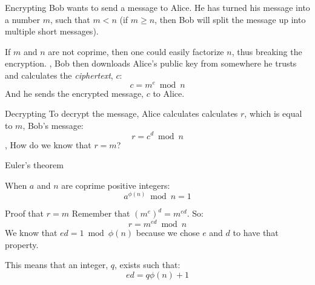 \begin{namedframe}{Encrypting}
	Bob wants to send a message to Alice.
	He has turned his message into a number $m$, such that $m < n$ (if $m \geq n$, then Bob will split the message up into multiple short messages).

	If $m$ and $n$ are not coprime, then one could easily factorize $n$, thus breaking the encryption.
	\sep
	Bob then downloads Alice's public key from somewhere he trusts and calculates the \emph{ciphertext}, $c$:
	\[c = m^e \bmod n\]
	And he sends the encrypted message, $c$ to Alice.
\end{namedframe}
\begin{namedframe}{Decrypting}
	To decrypt the message, Alice calculates calculates $r$, which is equal to $m$, Bob's message:
	\[r = c^d \bmod n\]
	\sep
	How do we know that $r = m$?
\end{namedframe}
\begin{namedframe}{Euler's theorem}
	\begin{theorem}
		When $a$ and $n$ are coprime positive integers:
		\[a^{\phi(n)} \bmod n = 1\]
	\end{theorem}
\end{namedframe}
\begin{namedframe}{Proof that $r = m$}
	Remember that $\left(m^e\right)^d = m^{ed}$. So:
	\[r = m^{ed} \bmod n\]
	We know that $ed = 1 \bmod \phi(n)$ because we chose $e$ and $d$ to have that property.

	This means that an integer, $q$, exists such that:
	\[ed = q\phi(n) + 1\]
\end{namedframe}

